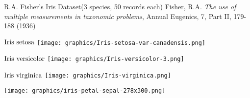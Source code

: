 


\begin{frame}{\Large \vskip -0.1cm R.A. Fisher's Iris Dataset\;\;\small(3 species, 50 records each)
\vskip -0.2cm{\tiny Fisher, R.A. \textit{The use of multiple measurements in taxonomic problems}, Annual Eugenics, 7, Part II, 179-188 (1936)}
}

\small

\begin{multicols}{2}

	\begin{flushleft}
	\begin{minipage}{4.5cm}
	\vskip -0.2cm
	\begin{center}
	$\textnormal{Iris setosa}$
	\vskip 0.05cm
	\texttt{[image: graphics/Iris-setosa-var-canadensis.png]}
	\end{center}
	\end{minipage}
	\end{flushleft}

\columnbreak

	\begin{flushright}
	\begin{minipage}{4.5cm}
	\vskip -0.2cm
	\begin{center}
	$\textnormal{Iris versicolor}$
	\vskip 0.05cm
	\texttt{[image: graphics/Iris-versicolor-3.png]}
	\end{center}
	\end{minipage}
	\end{flushright}

\end{multicols}

\begin{multicols}{2}

	\begin{flushleft}
	\begin{minipage}{4.5cm}
	\begin{center}
	$\textnormal{Iris virginica}$
	\vskip 0.05cm
	\texttt{[image: graphics/Iris-virginica.png]}
	\end{center}
	\end{minipage}
	\end{flushleft}

\columnbreak

	\begin{flushright}
	\begin{minipage}{4.5cm}
	\begin{center}
	\texttt{[image: graphics/iris-petal-sepal-278x300.png]}
	\end{center}
	\end{minipage}
	\end{flushright}

\end{multicols}

\end{frame}
\normalsize

